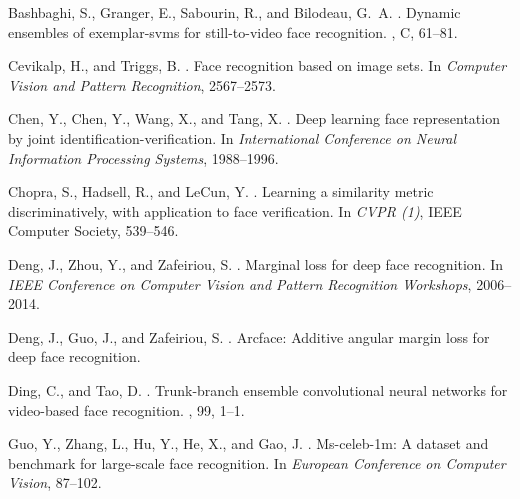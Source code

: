 \documentclass[conference]{acmsiggraph}
\begin{document}

\begin{thebibliography}{\protect{}1998}

{\sc Bashbaghi, S., Granger, E., Sabourin, R., and Bilodeau, G.~A.}
.
\newblock Dynamic ensembles of exemplar-svms for still-to-video face
  recognition.
, C, 61--81.

{\sc Cevikalp, H., and Triggs, B.}
.
\newblock Face recognition based on image sets.
\newblock In {\em Computer Vision and Pattern Recognition}, 2567--2573.

{\sc Chen, Y., Chen, Y., Wang, X., and Tang, X.}
.
\newblock Deep learning face representation by joint
  identification-verification.
\newblock In {\em International Conference on Neural Information Processing
  Systems}, 1988--1996.

{\sc Chopra, S., Hadsell, R., and LeCun, Y.}
.
\newblock Learning a similarity metric discriminatively, with application to
  face verification.
\newblock In {\em CVPR (1)}, IEEE Computer Society, 539--546.

{\sc Deng, J., Zhou, Y., and Zafeiriou, S.}
.
\newblock Marginal loss for deep face recognition.
\newblock In {\em IEEE Conference on Computer Vision and Pattern Recognition
  Workshops}, 2006--2014.

{\sc Deng, J., Guo, J., and Zafeiriou, S.}
.
\newblock Arcface: Additive angular margin loss for deep face recognition.

{\sc Ding, C., and Tao, D.}
.
\newblock Trunk-branch ensemble convolutional neural networks for video-based
  face recognition.
, 99, 1--1.

{\sc Guo, Y., Zhang, L., Hu, Y., He, X., and Gao, J.}
.
\newblock Ms-celeb-1m: A dataset and benchmark for large-scale face
  recognition.
\newblock In {\em European Conference on Computer Vision}, 87--102.


\end{thebibliography}
\end{document}
